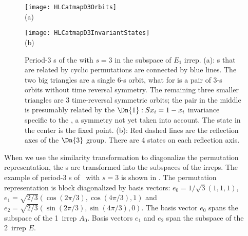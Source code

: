 \begin{figure}\begin{center}
            \begin{minipage}[c]{0.45\textwidth}\begin{center}
\texttt{[image: HLCatmapD3Orbits]}\\(a)
            \end{center}\end{minipage}
            \begin{minipage}[c]{0.45\textwidth}\begin{center}
\texttt{[image: HLCatmapD3InvariantStates]}\\(b)
            \end{center}\end{minipage}
\end{center}
  \caption{\label{fig:HLCatmapD3InvariantOrbits}
Period-3 {\lattstate}s of the {\tempLatt} with $s=3$ in the subspace of
$E_1$ irrep.
(a):
{\Lattstate}s that are related by cyclic permutations are connected by blue lines.
The two big triangles are a single  6-{\lattstate}s orbit, what for
 is a pair of 3-{\lattstate}s orbits without time reversal symmetry.
The remaining three smaller triangles are 3 time-reversal symmetric orbits;
the pair in the middle is presumably related by the
 $\Dn{1}: S\ssp_i = 1-\ssp_i$ invariance specific to
the \templatt, a symmetry not yet taken into account. The state in
the center is the fixed point.
(b):
Red dashed lines are the reflection axes of the $\Dn{3}$ group. There are 4 states
on each reflection axis.}
\end{figure}

When we use the similarity transformation to diagonalize the permutation representation,
the {\lattstate}s are transformed into the subspaces of the irreps.
The example of period-3 {\lattstate}s of \templatt\ with $s=3$ is shown in
. The permutation
representation is block diagonalized by basis vectors: $e_0=1/\sqrt{3}(1,1,1)$,
$e_1=\sqrt{2/3}(\cos(2\pi/3),\cos(4\pi/3),1)$ and $e_2=\sqrt{2/3}(\sin(2\pi/3),\sin(4\pi/3),0)$.
The basis vector $e_0$ spans the subspace of the 1\dmn\ irrep $A_0$.
Basis vectors $e_1$ and $e_2$ span the subspace of the 2\dmn\ irrep $E$.


